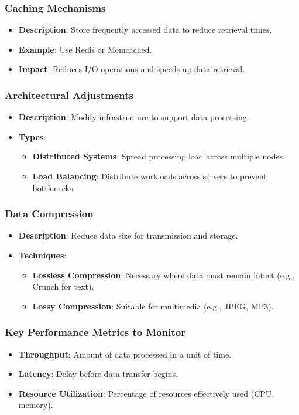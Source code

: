 \documentclass[aspectratio=169]{beamer}
\begin{document}
\begin{frame}[fragile]
    \frametitle{Caching Mechanisms}
    \begin{itemize}
        \item \textbf{Description}: Store frequently accessed data to reduce retrieval times.
        \item \textbf{Example}: Use Redis or Memcached.
        \item \textbf{Impact}: Reduces I/O operations and speeds up data retrieval.
    \end{itemize}
\end{frame}

\begin{frame}[fragile]
    \frametitle{Architectural Adjustments}
    \begin{itemize}
        \item \textbf{Description}: Modify infrastructure to support data processing.
        \item \textbf{Types}:
        \begin{itemize}
            \item \textbf{Distributed Systems}: Spread processing load across multiple nodes.
            \item \textbf{Load Balancing}: Distribute workloads across servers to prevent bottlenecks.
        \end{itemize}
    \end{itemize}
\end{frame}

\begin{frame}[fragile]
    \frametitle{Data Compression}
    \begin{itemize}
        \item \textbf{Description}: Reduce data size for transmission and storage.
        \item \textbf{Techniques}:
        \begin{itemize}
            \item \textbf{Lossless Compression}: Necessary where data must remain intact (e.g., Crunch for text).
            \item \textbf{Lossy Compression}: Suitable for multimedia (e.g., JPEG, MP3).
        \end{itemize}
    \end{itemize}
\end{frame}

\begin{frame}[fragile]
    \frametitle{Key Performance Metrics to Monitor}
    \begin{itemize}
        \item \textbf{Throughput}: Amount of data processed in a unit of time.
        \item \textbf{Latency}: Delay before data transfer begins.
        \item \textbf{Resource Utilization}: Percentage of resources effectively used (CPU, memory).
    \end{itemize}
\end{frame}
\end{document}
